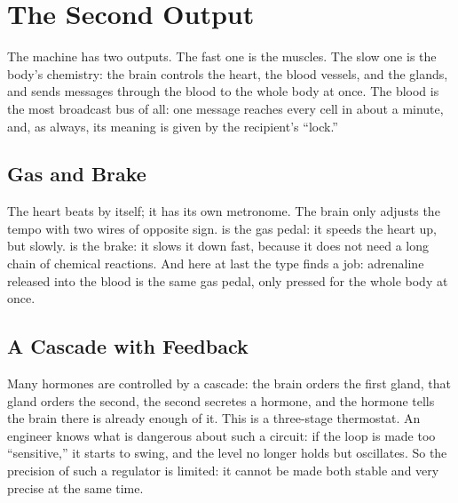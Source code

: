 \chapter{The Second Output}

The machine has two outputs. The fast one is the muscles. The slow one is the body's chemistry: the brain controls the heart, the blood vessels, and the glands, and sends messages through the blood to the whole body at once. The blood is the most broadcast bus of all: one message reaches every cell in about a minute, and, as always, its meaning is given by the recipient's ``lock.''

\section*{Gas and Brake}

The heart beats by itself; it has its own metronome. The brain only adjusts the tempo with two wires of opposite sign.  is the gas pedal: it speeds the heart up, but slowly.  is the brake: it slows it down fast, because it does not need a long chain of chemical reactions. And here at last the  type finds a job: adrenaline released into the blood is the same gas pedal, only pressed for the whole body at once.


\section*{A Cascade with Feedback}

Many hormones are controlled by a cascade: the brain orders the first gland, that gland orders the second, the second secretes a hormone, and the hormone tells the brain there is already enough of it. This is a three-stage thermostat. An engineer knows what is dangerous about such a circuit: if the loop is made too ``sensitive,'' it starts to swing, and the level no longer holds but oscillates. So the precision of such a regulator is limited: it cannot be made both stable and very precise at the same time.

